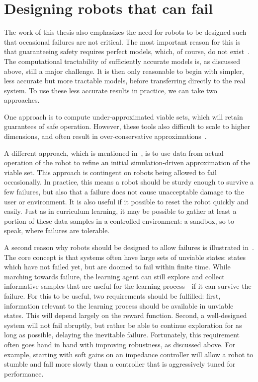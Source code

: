\section{Designing robots that can fail}
The work of this thesis also emphasizes the need for robots to be designed such that occasional failures are not critical. The most important reason for this is that guaranteeing safety requires perfect models, which, of course, do not exist~\cite{box1976science}. The computational tractability of sufficiently accurate models is, as discussed above, still a major challenge. It is then only reasonable to begin with simpler, less accurate but more tractable models, before transferring directly to the real system. To use these less accurate results in practice, we can take two approaches. \par
One approach is to compute under-approximated viable sets, which will retain guarantees of safe operation. However, these tools also difficult to scale to higher dimensions, and often result in over-conservative approximations~\cite{manchester2011regions}. \par
A different approach, which is mentioned in~\cite{heim2019learnable}, is to use data from actual operation of the robot to refine an initial simulation-driven approximation of the viable set. This approach is contingent on robots being allowed to fail occasionally. In practice, this means a robot should be sturdy enough to survive a few failures, but also that a failure does not cause unacceptable damage to the user or environment. It is also useful if it possible to reset the robot quickly and easily. Just as in curriculum learning, it may be possible to gather at least a portion of these data samples in a controlled environment: a sandbox, so to speak, where failures are tolerable. \par

A second reason why robots should be designed to allow failures is illustrated in~\cite{heim2018unviable}. The core concept is that systems often have large sets of unviable states: states which have not failed yet, but are doomed to fail within finite time. While marching towards failure, the learning agent can still explore and collect informative samples that are useful for the learning process - if it can survive the failure. For this to be useful, two requirements should be fulfilled: first, information relevant to the learning process should be available in unviable states. This will depend largely on the reward function. Second, a well-designed system will not fail abruptly, but rather be able to continue exploration for as long as possible, delaying the inevitable failure. Fortunately, this requirement often goes hand in hand with improving robustness, as discussed above. For example, starting with soft gains on an impedance controller will allow a robot to stumble and fall more slowly than a controller that is aggressively tuned for performance.


